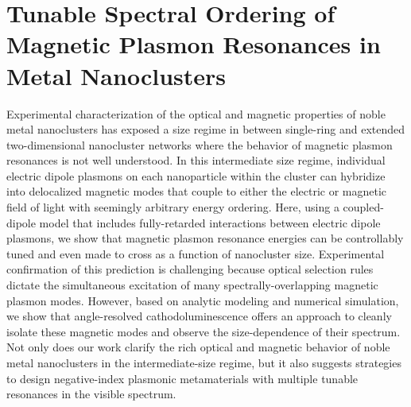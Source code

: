 \documentclass [11pt, proquest] {uwthesis}[2016/11/22]
\newenvironment{ch_abstract}
{%
\begin{center}
\begin{minipage}{\dimexpr\paperwidth-3in}
}
{%
\end{minipage}
\end{center}
}
\begin{document}
 
\chapter{Tunable Spectral Ordering of Magnetic Plasmon Resonances in Metal Nanoclusters}
 
\begin{ch_abstract}
Experimental characterization of the optical and magnetic properties of noble metal nanoclusters has exposed a size regime in between single-ring and extended two-dimensional nanocluster networks where the behavior of magnetic plasmon resonances is not well understood. In this intermediate size regime, individual electric dipole plasmons on each nanoparticle within the cluster can hybridize into delocalized magnetic modes that couple to either the electric or magnetic field of light with seemingly arbitrary energy ordering. Here, using a coupled-dipole model that includes fully-retarded interactions between electric dipole plasmons, we show that magnetic plasmon resonance energies can be controllably tuned and even made to cross as a function of nanocluster size. Experimental confirmation of this prediction is challenging because optical selection rules dictate the simultaneous excitation of many spectrally-overlapping magnetic plasmon modes. However, based on analytic modeling and numerical simulation, we show that angle-resolved cathodoluminescence offers an approach to cleanly isolate these magnetic modes and observe the size-dependence of their spectrum. Not only does our work clarify the rich optical and magnetic behavior of noble metal nanoclusters in the intermediate-size regime, but it also suggests strategies to design negative-index plasmonic metamaterials with multiple tunable resonances in the visible spectrum.
\end{ch_abstract}
\end{document}
